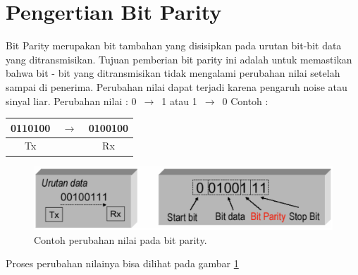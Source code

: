 
\section{Pengertian Bit Parity}
Bit Parity merupakan bit tambahan yang disisipkan pada urutan bit-bit data yang ditransmisikan.
Tujuan pemberian bit parity ini adalah untuk memastikan bahwa bit - bit yang ditransmisikan tidak mengalami perubahan nilai setelah sampai di penerima.
Perubahan nilai dapat terjadi karena pengaruh noise atau sinyal liar.
Perubahan nilai : 0 $\,\to\,$ 1 atau 1 $\,\to\,$ 0
\newline Contoh :
\begin{table}[h!]
\centering
\begin{tabular}{ c c c }
0110100 & $\,\to\,$ &  0100100\\
\hline
Tx &  & Rx \\
\end{tabular}
\end{table}

\begin{figure}[ht]
\centerline{\includegraphics[width=1\textwidth]{figures/perubahan_nilai_bit_parity.png}}
\caption{Contoh perubahan nilai pada bit parity.}
\label{perubahan_nilai_bit_parity}
\end{figure}

Proses perubahan nilainya bisa dilihat pada gambar \ref{perubahan_nilai_bit_parity}

